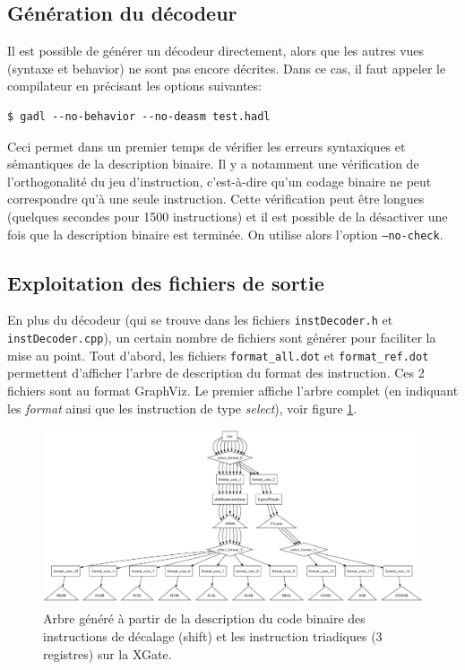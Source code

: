 \subsection{Génération du décodeur}
Il est possible de générer un décodeur directement, alors que les autres vues (syntaxe et behavior) ne sont pas encore décrites. Dans ce cas, il faut appeler le compilateur en précisant les options suivantes:
\begin{verbatim}
$ gadl --no-behavior --no-deasm test.hadl
\end{verbatim}
Ceci permet dans un premier temps de vérifier les erreurs syntaxiques et sémantiques de la description binaire. Il y a notamment une vérification de l'orthogonalité du jeu d'instruction, c'est-à-dire qu'un codage binaire ne peut correspondre qu'à une seule instruction. Cette vérification peut être longues (quelques secondes pour 1500 instructions) et il est possible de la désactiver une fois que la description binaire est terminée. On utilise alors l'option \texttt{--no-check}.

\subsection{Exploitation des fichiers de sortie}
En plus du décodeur (qui se trouve dans les fichiers \texttt{instDecoder.h} et \texttt{instDecoder.cpp}), un certain nombre de fichiers sont générer pour faciliter la mise au point. Tout d'abord, les fichiers \texttt{format\_all.dot} et \texttt{format\_ref.dot} permettent d'afficher l'arbre de description du format des instruction. Ces 2 fichiers sont au format GraphViz. Le premier affiche l'arbre complet (en indiquant les \emph{format} ainsi que les instruction de type \emph{select}), voir figure \ref{fig:formatAllTest}.

\begin{figure}[h]		%
  \begin{center}
    \includegraphics[width=\linewidth]{../common/images/format_all_test.pdf}
    \caption{Arbre généré à partir de la description du code binaire des instructions de décalage (shift) et les instruction triadiques (3 registres) sur la XGate.}
    \label{fig:formatAllTest}
  \end{center}
\end{figure}

